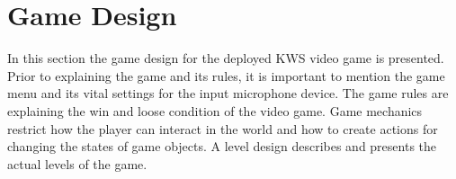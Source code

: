 
\section{Game Design}\label{sec:game_design}
\thesisStateReady
In this section the game design for the deployed KWS video game is presented.
Prior to explaining the game and its rules, it is important to mention the game menu and its vital settings for the input microphone device.
The game rules are explaining the win and loose condition of the video game.
Game mechanics restrict how the player can interact in the world and how to create actions for changing the states of game objects.
A level design describes and presents the actual levels of the game.



